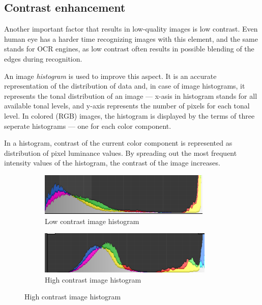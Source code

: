 \subsection{Contrast enhancement}

Another important factor that results in low-quality images is low contrast. Even human eye has a harder time recognizing images 
with this element, and the same stands for OCR engines, as low contrast often results in possible blending of the edges during recognition.

An image \emph{histogram} is used to improve this aspect. It is an accurate representation of the distribution of data and, in case of image histograms, it represents the tonal distribution of an image --- x-asis in histogram stands for all available tonal levels, and y-axis represents the number of pixels for each tonal level. In colored (RGB) images, the histogram is displayed by the terms of three seperate histograms --- one for each color component.

In a histogram, contrast of the current color component is represented as distribution of pixel luminance values. By spreading out the most frequent intensity values of the histogram, the contrast of the image increases.

\begin{figure}[H]
\centering
\hspace*{\fill} %
\begin{subfigure}{0.31\textwidth}
\includegraphics[width=\linewidth]{img/histogram_low.png}
\caption{Low contrast image histogram} \label{fig:1a}
\end{subfigure}
\hspace*{\fill} %
\begin{subfigure}{0.31\textwidth}
\includegraphics[width=\linewidth]{img/histogram_high.png}
\caption{High contrast image histogram} \label{fig:1b}
\end{subfigure}
\end{figure}

